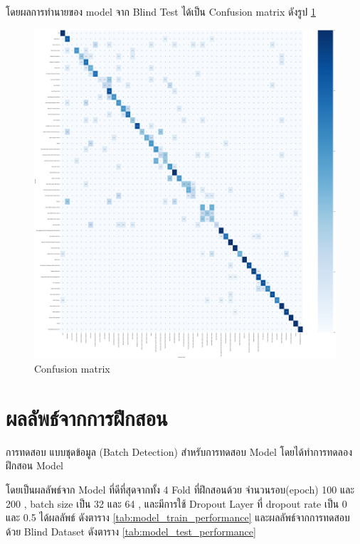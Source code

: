 โดยผลการทำนายของ model  จาก Blind Test ได้เป็น Confusion matrix ดังรูป \ref{fig:Confusion matrix}
\begin{figure}[h]
    \begin{center}

        \includegraphics[scale=0.1]{pic/model/blind_pic_4_ccm.png}
    \end{center}

    \caption[Confusion matrix]{Confusion matrix}
    \label{fig:Confusion matrix}
\end{figure}


\newpage

\section{ผลลัพธ์จากการฝึกสอน}
การทดสอบ แบบชุดข้อมูล (Batch Detection) สําหรับการทดสอบ Model โดยได้ทำการทดลอง ฝึกสอน Model 
\par โดยเป็นผลลัพธ์จาก Model ที่ดีที่สุดจากทั้ง 4 Fold
ที่ฝึกสอนด้วย จำนวนรอบ(epoch) 100 และ 200  , batch size เป็น 32 และ 64 , และมีการใช้ Dropout Layer ที่ dropout rate เป็น 0 และ 0.5
ได้ผลลัพธ์ ดังตาราง \ref{tab:model_train_performance} และผลลัพธ์จากการทดสอบด้วย Blind Dataset ดังตาราง \ref{tab:model_test_performance}

